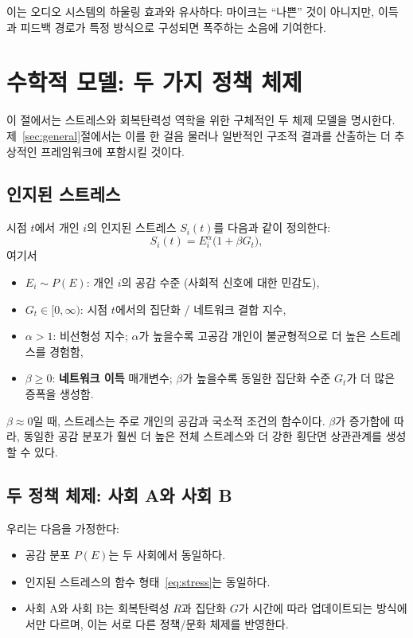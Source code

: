\documentclass[11pt]{article}
\theoremstyle{plain}
\begin{document}
이는 오디오 시스템의 하울링 효과와 유사하다: 마이크는 ``나쁜'' 것이 아니지만, 이득과 피드백 경로가 특정 방식으로 구성되면 폭주하는 소음에 기여한다.

\section{수학적 모델: 두 가지 정책 체제}
\label{sec:model}

이 절에서는 스트레스와 회복탄력성 역학을 위한 구체적인 두 체제 모델을 명시한다.
제~\ref{sec:general}절에서는 이를 한 걸음 물러나 일반적인 구조적 결과를 산출하는 더 추상적인 프레임워크에 포함시킬 것이다.

\subsection{인지된 스트레스}

시점 $t$에서 개인 $i$의 인지된 스트레스 $S_i(t)$를 다음과 같이 정의한다:
\begin{equation}
S_i(t) = E_i^{\alpha} \bigl( 1 + \beta G_t \bigr),
\label{eq:stress}
\end{equation}
여기서
\begin{itemize}
  \item $E_i \sim P(E)$: 개인 $i$의 공감 수준 (사회적 신호에 대한 민감도),
  \item $G_t \in [0,\infty)$: 시점 $t$에서의 집단화 / 네트워크 결합 지수,
  \item $\alpha > 1$: 비선형성 지수; $\alpha$가 높을수록 고공감 개인이 불균형적으로 더 높은 스트레스를 경험함,
  \item $\beta \ge 0$: \textbf{네트워크 이득} 매개변수; $\beta$가 높을수록 동일한 집단화 수준 $G_t$가 더 많은 증폭을 생성함.
\end{itemize}

$\beta \approx 0$일 때, 스트레스는 주로 개인의 공감과 국소적 조건의 함수이다.
$\beta$가 증가함에 따라, 동일한 공감 분포가 훨씬 더 높은 전체 스트레스와 더 강한 횡단면 상관관계를 생성할 수 있다.

\subsection{두 정책 체제: 사회 A와 사회 B}

우리는 다음을 가정한다:
\begin{itemize}
  \item 공감 분포 $P(E)$는 두 사회에서 동일하다.
  \item 인지된 스트레스의 함수 형태~\eqref{eq:stress}는 동일하다.
  \item 사회 A와 사회 B는 회복탄력성 $R$과 집단화 $G$가 시간에 따라 업데이트되는 방식에서만 다르며, 이는 서로 다른 정책/문화 체제를 반영한다.
\end{itemize}
\end{document}
